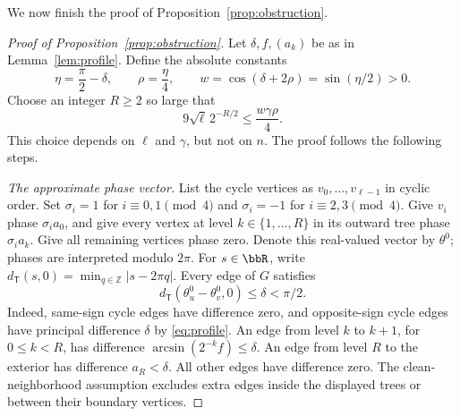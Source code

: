 \documentclass[11pt,reqno]{amsart}
\def\TT{{\mathsf{T}}}
\begin{document}
We now finish the proof of Proposition~\ref{prop:obstruction}.
\begin{proof}[Proof of Proposition~\ref{prop:obstruction}]
Let $\delta,f,(a_k)$ be as in Lemma~\ref{lem:profile}. Define the absolute constants
\[
 \eta=\frac\pi2-\delta,\qquad
 \rho=\frac\eta4,\qquad
 w=\cos(\delta+2\rho)=\sin(\eta/2)>0.
\]
Choose an integer $R\ge2$ so large that
\begin{equation}\label{eq:Rchoice}
 9\sqrt\ell\,2^{-R/2}\le\frac{w\gamma\rho}{4}.
\end{equation}
This choice depends on $\ell$ and $\gamma$, but not on $n$. The proof follows the following steps.

\smallskip
\emph{The approximate phase vector.}
List the cycle vertices as $v_0,\ldots,v_{\ell-1}$ in cyclic order. Set $\sigma_i=1$ for $i\equiv0,1\pmod4$ and $\sigma_i=-1$ for $i\equiv2,3\pmod4$. Give $v_i$ phase $\sigma_i a_0$, and give every vertex at level $k\in\{1,\ldots,R\}$ in its outward tree phase $\sigma_i a_k$. Give all remaining vertices phase zero. Denote this real-valued vector by $\theta^0$; phases are interpreted modulo $2\pi$. For $s\in\bbR$, write $d_{\TT}(s,0)=\min_{q\in\mathbb Z}|s-2\pi q|$. Every edge of $G$ satisfies
\begin{equation}\label{eq:acute}
 d_{\TT}(\theta^0_u-\theta^0_v,0)\le\delta<\pi/2.
\end{equation}
Indeed, same-sign cycle edges have difference zero, and opposite-sign cycle edges have principal difference $\delta$ by \eqref{eq:profile}. An edge from level $k$ to $k+1$, for $0\le k<R$, has difference $\arcsin(2^{-k}f)\le\delta$. An edge from level $R$ to the exterior has difference $a_R<\delta$. All other edges have difference zero. The clean-neighborhood assumption excludes extra edges inside the displayed trees or between their boundary vertices.


\end{proof}
\end{document}
